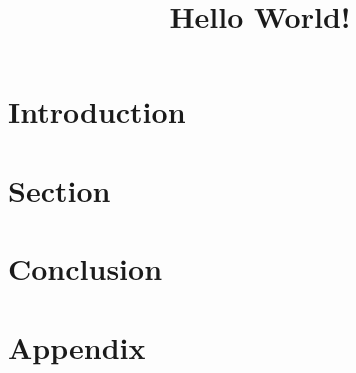 \documentclass[12pt, a4paper]{article}
\title{Hello World!}
\author{}
\date{}
\begin{document}
\begin{titlepage}
\clearpage\maketitle
\thispagestyle{empty}
\begin{abstract}
\end{abstract}
\end{titlepage}

	\section{Introduction} \label{sec:introduction}
	
	\section{Section} \label{sec:}
	
	\section{Conclusion} \label{sec:conclusion}
	
	\newpage
	
	
	\newpage
	\appendix
	\section{Appendix} \label{sec:appendix}
\end{document}
